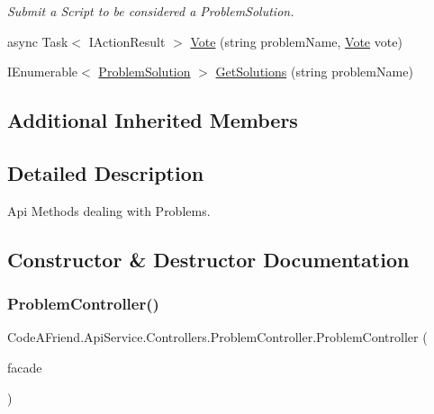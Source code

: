 \begin{DoxyCompactItemize}
\begin{DoxyCompactList}\small\item\em Submit a Script to be considered a Problem\+Solution. \end{DoxyCompactList}\item 
async Task$<$ I\+Action\+Result $>$ \mbox{\hyperlink{class_code_a_friend_1_1_api_service_1_1_controllers_1_1_problem_controller_a45c84969b2e5ac1fc9fd5c6c35627068}{Vote}} (string problem\+Name, \mbox{\hyperlink{class_code_a_friend_1_1_data_model_1_1_vote}{Vote}} vote)
\item 
I\+Enumerable$<$ \mbox{\hyperlink{class_code_a_friend_1_1_data_model_1_1_problem_solution}{Problem\+Solution}} $>$ \mbox{\hyperlink{class_code_a_friend_1_1_api_service_1_1_controllers_1_1_problem_controller_a025801b9dc8ac12ae97bab9bdf81a494}{Get\+Solutions}} (string problem\+Name)
\end{DoxyCompactItemize}
\subsection*{Additional Inherited Members}


\subsection{Detailed Description}
Api Methods dealing with Problems. 



\subsection{Constructor \& Destructor Documentation}
\mbox{\label{class_code_a_friend_1_1_api_service_1_1_controllers_1_1_problem_controller_a2f0d98d308a3adc0712b52b4fd3945de}} 
\subsubsection{\texorpdfstring{Problem\+Controller()}{ProblemController()}}
{\footnotesize\ttfamily Code\+A\+Friend.\+Api\+Service.\+Controllers.\+Problem\+Controller.\+Problem\+Controller (\begin{DoxyParamCaption}\item[{\mbox{\hyperlink{interface_code_a_friend_1_1_facade_1_1_i_code_a_friend_facade}{I\+Code\+A\+Friend\+Facade}}}]{facade }\end{DoxyParamCaption})}







